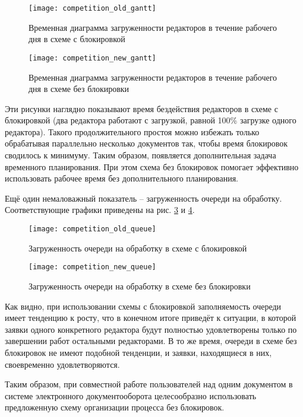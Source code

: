 \begin{figure}[h!]
  \centering
  \texttt{[image: competition\_old\_gantt]}
  \caption{Временная диаграмма загруженности редакторов в течение рабочего дня в схеме с блокировкой}
  \label{img:competition_old_gantt}
\end{figure}

\begin{figure}[h!]
  \centering
  \texttt{[image: competition\_new\_gantt]}
  \caption{Временная диаграмма загруженности редакторов в течение рабочего дня в схеме без блокировки}
  \label{img:competition_new_gantt}
\end{figure}

\vspace{\baselineskip}
Эти рисунки наглядно показывают время бездействия редакторов в схеме с блокировкой (два редактора работают с загрузкой, равной 100\% загрузке одного редактора). Такого продолжительного простоя можно избежать только обрабатывая параллельно несколько документов так, чтобы время блокировок сводилось к минимуму. Таким образом, появляется дополнительная задача временн\textit{о}го планирования. При этом схема без блокировок помогает эффективно использовать рабочее время без дополнительного планирования.

\vspace{\baselineskip}
Ещё один немаловажный показатель -- загруженность очереди на обработку. Соответствующие графики приведены на рис. \ref{img:competition_old_queue} и \ref{img:competition_new_queue}.

\begin{figure}[h!]
  \centering
  \texttt{[image: competition\_old\_queue]}
  \caption{Загруженность очереди на обработку в схеме с блокировкой}
  \label{img:competition_old_queue}
\end{figure}

\begin{figure}[h!]
  \centering
  \texttt{[image: competition\_new\_queue]}
  \caption{Загруженность очереди на обработку в схеме без блокировки}
  \label{img:competition_new_queue}
\end{figure}

\vspace{\baselineskip}
Как видно, при использовании схемы с блокировкой заполняемость очереди имеет тенденцию к росту, что в конечном итоге приведёт к ситуации, в которой заявки одного конкретного редактора будут полностью удовлетворены только по завершении работ остальными редакторами. В то же время, очереди в схеме без блокировок не имеют подобной тенденции, и заявки, находящиеся в них, своевременно удовлетворяются.

\vspace{\baselineskip}
Таким образом, при совместной работе пользователей над одним документом в системе электронного документооборота целесообразно использовать предложенную схему организации процесса без блокировок.